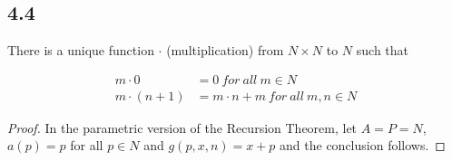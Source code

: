 \subsection*{4.4} There is a unique function $\cdot$ (multiplication) from $N \times N$ to $N$ such that

\begin{align*}
    m \cdot 0 &= 0~for~all~m \in N \\
    m \cdot (n+1) &= m \cdot n + m~ for~all~m,n \in N
\end{align*}

\begin{proof}
In the parametric version of the Recursion Theorem, let $A = P = N$, $a(p) = p$ for all $p \in N$ and $g(p, x, n) = x+p$ and the conclusion follows.
\end{proof}

